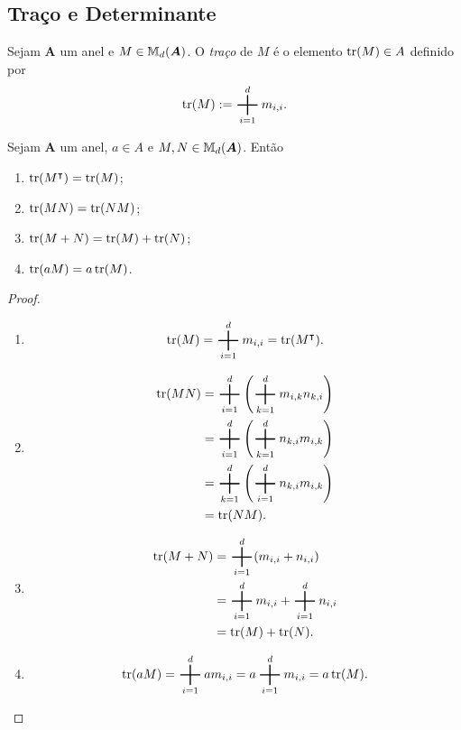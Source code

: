 \subsection{Traço e Determinante}

\begin{defi}
	Sejam $\bm A$ um anel e $M \in \mathbb{M}_d(\bm A)$. O \emph{traço} de $M$ é o elemento $\operatorname{tr}(M) \in A$ definido por
	\begin{equation*}
	\tr(M) := \sum_{i=1}^d m_{i,i}.
	\end{equation*}
\end{defi}

\begin{prop}
	Sejam $\bm A$ um anel, $a \in A$ e $M,N \in \mathbb{M}_d(\bm A)$. Então
	\begin{enumerate}
	\item $\operatorname{tr}(M^\intercal)=\operatorname{tr}(M)$;
	\item $\operatorname{tr}(MN)=\operatorname{tr}(NM)$;
	\item $\operatorname{tr}(M+N)=\operatorname{tr}(M)+\operatorname{tr}(N)$;
	\item $\operatorname{tr}(aM)=a\operatorname{tr}(M)$.
	\end{enumerate}
\end{prop}
\begin{proof}
	\begin{enumerate}
	\item
		\begin{equation*}
		\tr(M) = \sum_{i=1}^d m_{i,i} = \tr(M^\intercal).
		\end{equation*}
	\item
		\begin{align*}
		\tr(MN) &= \sum_{i=1}^d \left(\sum_{k=1}^d m_{i,k}n_{k,i}\right) \\
		&= \sum_{i=1}^d \left(\sum_{k=1}^d n_{k,i}m_{i,k}\right) \\
		&= \sum_{k=1}^d \left(\sum_{i=1}^d n_{k,i}m_{i,k}\right) \\
		&= \tr(NM).
		\end{align*}
	\item
		\begin{align*}
		\tr(M+N) &= \sum_{i=1}^d (m_{i,i} + n_{i,i}) \\
		&= \sum_{i=1}^d m_{i,i} + \sum_{i=1}^d n_{i,i} \\
		&= \tr(M) + \tr(N).
		\end{align*}
	\item
		\begin{equation*}
		\tr(aM) = \sum_{i=1}^d am_{i,i} = a\sum_{i=1}^d m_{i,i} = a\tr(M).
		\end{equation*}
\qedhere
	\end{enumerate}
\end{proof}





